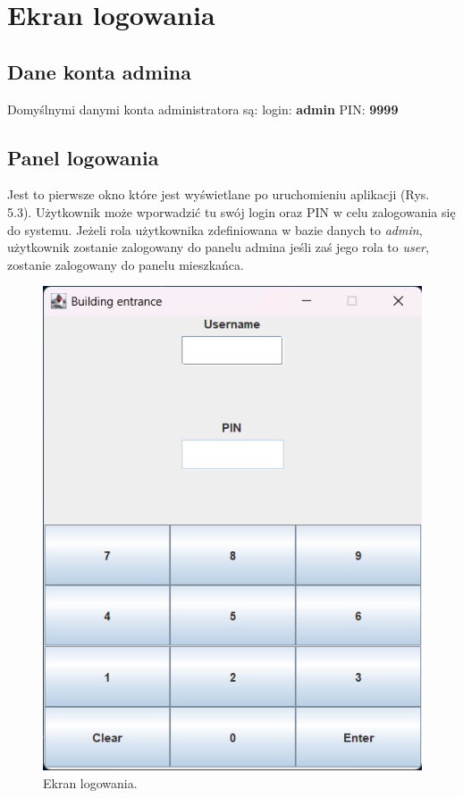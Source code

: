\newpage
\section{Ekran logowania}
\subsection{Dane konta admina}
\noindent Domyślnymi danymi konta administratora są: 
\newline login: \textbf{admin}
\newline PIN: \textbf{9999}

\subsection{Panel logowania}
Jest to pierwsze okno które jest wyświetlane po uruchomieniu aplikacji (Rys. 5.3). Użytkownik może wporwadzić tu swój login oraz PIN w celu
zalogowania się do systemu. Jeżeli rola użytkownika zdefiniowana w bazie danych to \textit{admin}, użytkownik 
zostanie zalogowany do panelu admina jeśli zaś jego rola to \textit{user}, zostanie zalogowany do panelu mieszkańca.

\begin{figure}[H]
    \centering
    \includegraphics[width=\textwidth,height=0.5\textheight,keepaspectratio]{figures/app-images/panel-logowania.png}
    \caption{Ekran logowania. \cite{SwingLayouts} \label{fig8}}
\end{figure}

